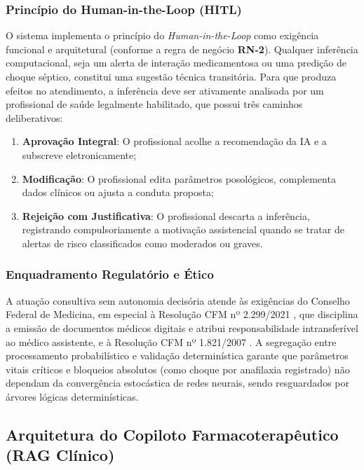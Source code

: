 \subsubsection{Princípio do Human-in-the-Loop (HITL)}
O sistema implementa o princípio do \textit{Human-in-the-Loop} como exigência funcional e arquitetural (conforme a regra de negócio \textbf{RN-2}). Qualquer inferência computacional, seja um alerta de interação medicamentosa ou uma predição de choque séptico, constitui uma sugestão técnica transitória. Para que produza efeitos no atendimento, a inferência deve ser ativamente analisada por um profissional de saúde legalmente habilitado, que possui três caminhos deliberativos:
\begin{enumerate}[label=(\alph*), noitemsep]
    \item \textbf{Aprovação Integral}: O profissional acolhe a recomendação da IA e a subscreve eletronicamente;
    \item \textbf{Modificação}: O profissional edita parâmetros posológicos, complementa dados clínicos ou ajusta a conduta proposta;
    \item \textbf{Rejeição com Justificativa}: O profissional descarta a inferência, registrando compulsoriamente a motivação assistencial quando se tratar de alertas de risco classificados como moderados ou graves.
\end{enumerate}

\subsubsection{Enquadramento Regulatório e Ético}
A atuação consultiva sem autonomia decisória atende às exigências do Conselho Federal de Medicina, em especial à Resolução CFM nº 2.299/2021 \cite{cfm_digital:2021}, que disciplina a emissão de documentos médicos digitais e atribui responsabilidade intransferível ao médico assistente, e à Resolução CFM nº 1.821/2007 \cite{cfm_prontuario:2007}. A segregação entre processamento probabilístico e validação determinística garante que parâmetros vitais críticos e bloqueios absolutos (como choque por anafilaxia registrado) não dependam da convergência estocástica de redes neurais, sendo resguardados por árvores lógicas determinísticas.

\subsection{Arquitetura do Copiloto Farmacoterapêutico (RAG Clínico)}
\label{subsec:ia_copiloto_rag}

